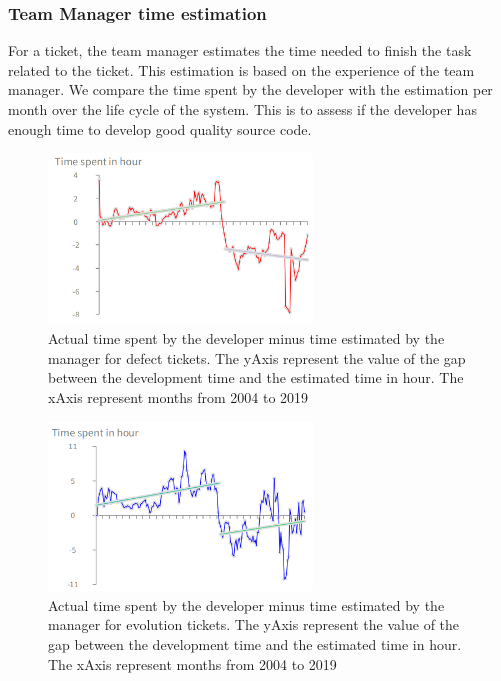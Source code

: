 \documentclass[10pt,conference]{IEEEtran}
\begin{document}
 \subsubsection{Team Manager time estimation}
For a ticket, the team manager estimates the time needed to finish the task related to the ticket.
This estimation is based on the experience of the team manager.  
We compare the time spent by the developer with the estimation per month over the life cycle of the system.  
This is to assess if the developer has enough time to develop good quality source code.
\begin{figure}[H]
  \centering
  \includegraphics[width=70mm]{./images/estimateBug.png}
  \caption{Actual time spent by the developer minus time estimated by the manager for defect tickets.  The yAxis represent the value of the gap between the development time and the estimated time in hour. The xAxis represent months from 2004 to 2019}
  \label{fig:devEstDefect}
\end{figure}

\begin{figure}[H]
  \centering
  \includegraphics[width=70mm]{./images/estimateEvol.png}
  \caption{Actual time spent by the developer minus time estimated by the manager for evolution tickets. 
    The yAxis represent the value of the gap between the development time and the estimated time in hour. 
    The xAxis represent months from 2004 to 2019}
  \label{fig:devEstEvol}
\end{figure}
\end{document}

